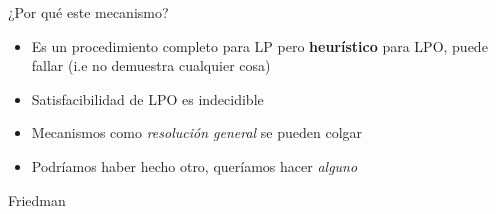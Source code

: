 \documentclass[xcolor={dvipsnames},spanish]{beamer}
\begin{document}
\begin{frame}{¿Por qué este mecanismo?}
    \begin{itemize}
        \item Es un procedimiento completo para LP pero \textbf{heurístico} para LPO, puede fallar (i.e no demuestra cualquier cosa)
        \item Satisfacibilidad de LPO es indecidible
        \item Mecanismos como \textit{resolución general} se pueden colgar
        \item Podríamos haber hecho otro, queríamos hacer \textit{alguno}
    \end{itemize}
    
\end{frame}




    

\begin{frame}{Friedman}
    \begin{figure}
    \centering
\end{figure}
\end{frame}
\end{document}
